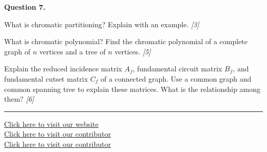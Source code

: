 \documentclass[11pt,a4paper]{article}
\newcommand{\pts}[1]{\hfill   \textit{[#1]}}
\begin{document}
\noindent   \textbf{Question 7.}

\begin{parts}
  \item What is chromatic partitioning? Explain with an example. \pts{3}
  \item What is chromatic polynomial? Find the chromatic polynomial of a complete graph of $n$ vertices and a tree of $n$ vertices. \pts{5}
  \item Explain the reduced incidence matrix $A_f$, fundamental circuit matrix $B_f$, and fundamental cutset matrix $C_f$ of a connected graph. Use a common graph and common spanning tree to explain these matrices. What is the relationship among them? \pts{6}
\end{parts}

\vfill
\rule{\linewidth}{0.4pt}

\begin{center}\small
\href{https://bhu-exam.vercel.app/}{Click here to visit our website}\\[4pt]\href{https://me-aryan.vercel.app/}{Click here to visit our contributor}\\[4pt]\href{https://quashan-me.vercel.app/}{Click here to visit our contributor}
\end{center}
\end{document}
